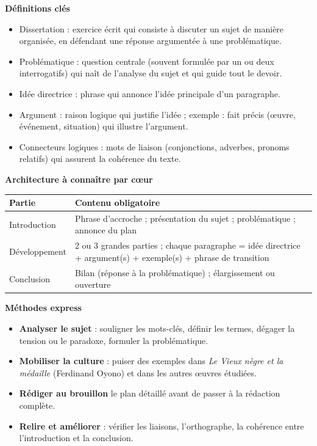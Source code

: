 \documentclass[11pt]{article}
\newcommand{\cle}[1]{{\popxbold\color{popdark}#1}}
\begin{document}
\begin{aretenir}
\textbf{Définitions clés}
\begin{itemize}
\item \cle{Dissertation} : exercice écrit qui consiste à discuter un sujet de manière organisée, en défendant une réponse argumentée à une problématique.
\item \cle{Problématique} : question centrale (souvent formulée par un ou deux interrogatifs) qui naît de l'analyse du sujet et qui guide tout le devoir.
\item \cle{Idée directrice} : phrase qui annonce l'idée principale d'un paragraphe.
\item \cle{Argument} : raison logique qui justifie l'idée ; \cle{exemple} : fait précis (œuvre, événement, situation) qui illustre l'argument.
\item \cle{Connecteurs logiques} : mots de liaison (conjonctions, adverbes, pronoms relatifs) qui assurent la cohérence du texte.
\end{itemize}

\textbf{Architecture à connaître par c\oe ur}
\begin{center}
\begin{tabularx}{\linewidth}{|l|X|}
\hline
\rowcolor{popblueL} \textbf{Partie} & \textbf{Contenu obligatoire} \\
\hline
Introduction & Phrase d'accroche ; présentation du sujet ; problématique ; annonce du plan \\
\hline
Développement & 2 ou 3 grandes parties ; chaque paragraphe = idée directrice + argument(s) + exemple(s) + phrase de transition \\
\hline
Conclusion & Bilan (réponse à la problématique) ; élargissement ou ouverture \\
\hline
\end{tabularx}
\end{center}

\textbf{Méthodes express}
\begin{itemize}
\item \textbf{Analyser le sujet} : souligner les mots-clés, définir les termes, dégager la tension ou le paradoxe, formuler la problématique.
\item \textbf{Mobiliser la culture} : puiser des exemples dans \emph{Le Vieux nègre et la médaille} (Ferdinand Oyono) et dans les autres œuvres étudiées.
\item \textbf{Rédiger au brouillon} le plan détaillé avant de passer à la rédaction complète.
\item \textbf{Relire et améliorer} : vérifier les liaisons, l'orthographe, la cohérence entre l'introduction et la conclusion.
\end{itemize}
\end{aretenir}
\end{document}
